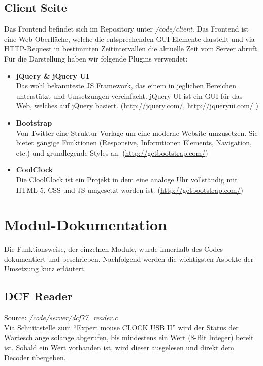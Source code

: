 \subsection{Client Seite}
Das Frontend befindet sich im Repository unter \textit{/code/client}. Das Frontend ist eine Web-Oberfläche, welche die entsprechenden GUI-Elemente darstellt und via HTTP-Request in bestimmten Zeitintervallen die aktuelle Zeit vom Server abruft.\\

Für die Darstellung haben wir folgende Plugins verwendet:
\begin{itemize}
\item \textbf{jQuery \& jQuery UI}\\
Das wohl bekannteste JS Framework, das einem in jeglichen Bereichen unterstützt und Umsetzungen vereinfacht. jQuery UI ist ein GUI für das Web, welches auf jQuery basiert. (\url{http://jquery.com/}, \url{http://jqueryui.com/} )

\item \textbf{Bootstrap}\\
Von Twitter eine Struktur-Vorlage um eine moderne Website umzusetzen. Sie bietet gängige Funktionen (Responsive, Informtionen Elements, Navigation, etc.) und grundlegende Styles an. (\url{http://getbootstrap.com/})

\item \textbf{CoolClock}\\
Die CloolClock ist ein Projekt in dem eine analoge Uhr vollständig mit HTML 5, CSS und JS umgesetzt worden ist. (\url{http://getbootstrap.com/})


\end{itemize}


\section{Modul-Dokumentation}
Die Funktionsweise, der einzelnen Module, wurde innerhalb des Codes dokumentiert und beschrieben. Nachfolgend werden die wichtigsten Aspekte der Umsetzung kurz erläutert.

\subsection{DCF Reader}
Source: \textit{/code/server/dcf77\_reader.c}\\
Via Schnittstelle zum "`Expert mouse CLOCK USB II"' wird der Status der Warteschlange  solange abgerufen, bis mindestens ein Wert (8-Bit Integer) bereit ist.
Sobald ein Wert vorhanden ist, wird dieser ausgelesen und direkt dem Decoder übergeben.

